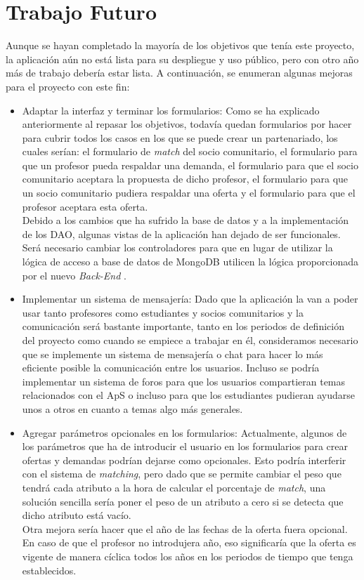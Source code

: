\documentclass[11pt]{book}
\begin{document}
	\section{Trabajo Futuro}
	Aunque se hayan completado la mayoría de los objetivos que tenía este proyecto, la aplicación aún no está lista para su despliegue y uso público, pero con otro año más de trabajo debería estar lista. A continuación, se enumeran algunas mejoras para el proyecto con este fin:
	\begin{itemize}
		\item Adaptar la interfaz y terminar los formularios: Como se ha explicado anteriormente al repasar los objetivos, todavía quedan formularios por hacer para cubrir todos los casos en los que se puede crear un partenariado, los cuales serían: el formulario de \emph{match} del socio comunitario, el formulario para que un profesor pueda respaldar una demanda, el formulario para que el socio comunitario aceptara la propuesta de dicho profesor, el formulario para que un socio comunitario pudiera respaldar una oferta y el formulario para que el profesor aceptara esta oferta.\\
		Debido a los cambios que ha sufrido la base de datos y a la implementación de los DAO, algunas vistas de la aplicación han dejado de ser funcionales. Será necesario cambiar los controladores para que en lugar de utilizar la lógica de acceso a base de datos de MongoDB utilicen la lógica proporcionada por el nuevo \emph{ Back-End }.
		\item Implementar un sistema de mensajería: Dado que la aplicación la van a poder usar tanto profesores como estudiantes y socios comunitarios y la comunicación será bastante importante, tanto en los periodos de definición del proyecto como cuando se empiece a trabajar en él, consideramos necesario que se implemente un sistema de mensajería o chat para hacer lo más eficiente posible la comunicación entre los usuarios. Incluso se podría implementar un sistema de foros para que los usuarios compartieran temas relacionados con el ApS o incluso para que los estudiantes pudieran ayudarse unos a otros en cuanto a temas algo más generales.
		\item Agregar parámetros opcionales en los formularios: Actualmente, algunos de los parámetros que ha de introducir el usuario en los formularios para crear ofertas y demandas podrían dejarse como opcionales. Esto podría interferir con el sistema de \emph{matching}, pero dado que se permite cambiar el peso que tendrá cada atributo a la hora de calcular el porcentaje de \emph{match}, una solución sencilla sería poner el peso de un atributo a cero si se detecta que dicho atributo está vacío.\\
		Otra mejora sería hacer que el año de las fechas de la oferta fuera opcional. En caso de que el profesor no introdujera año, eso significaría que la oferta es vigente de manera cíclica todos los años en los periodos de tiempo que tenga establecidos.
	\end{itemize}
	
\end{document}
